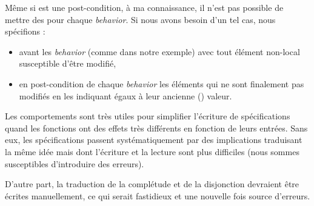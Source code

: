 \begin{Warning}
Même si  est une post-condition, à ma connaissance, il n'est pas 
possible de mettre des  pour chaque \textit{behavior}. Si nous avons
besoin d'un tel cas, nous spécifions :

\begin{itemize}
\item {} avant les \textit{behavior} (comme dans notre exemple) avec tout 
élément non-local susceptible d'être modifié,
\item en post-condition de chaque \textit{behavior} les éléments qui ne sont finalement 
pas modifiés en les indiquant égaux à leur ancienne () valeur.
\end{itemize}
\end{Warning}


Les comportements sont très utiles pour simplifier l'écriture de spécifications
quand les fonctions ont des effets très différents en fonction de leurs 
entrées. Sans eux, les spécifications passent systématiquement par des 
implications traduisant la même idée mais dont l'écriture et la lecture sont 
plus difficiles (nous sommes susceptibles d'introduire des erreurs).



D'autre part, la traduction de la complétude et de la disjonction devraient 
être écrites manuellement, ce qui serait fastidieux et une nouvelle fois source
d'erreurs.
